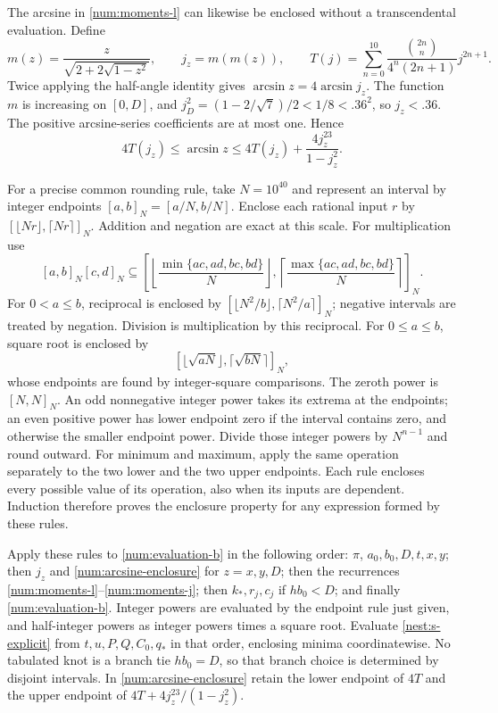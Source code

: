 The arcsine in \eqref{num:moments-l} can likewise be enclosed
without a transcendental evaluation. Define
\[
 m(z)=\frac{z}{\sqrt{2+2\sqrt{1-z^2}}},\qquad
 j_z=m(m(z)),\qquad
 T(j)=\sum_{n=0}^{10}\frac{\binom{2n}{n}}{4^n(2n+1)}j^{2n+1}.
\]
Twice applying the half-angle identity gives
$\arcsin z=4\arcsin j_z$. The function $m$ is increasing on
$[0,D]$, and
$j_D^2=(1-2/\sqrt7)/2<1/8<.36^2$, so $j_z<.36$.
The positive arcsine-series coefficients are at most one. Hence
\begin{equation}\label{num:arcsine-enclosure}
 4T(j_z)\le\arcsin z
 \le4T(j_z)+\frac{4j_z^{23}}{1-j_z^2}.
\end{equation}

For a precise common rounding rule, take $N=10^{40}$ and represent
an interval by integer endpoints $[a,b]_N=[a/N,b/N]$.
Enclose each rational input $r$ by
$[\lfloor Nr\rfloor,\lceil Nr\rceil]_N$. Addition and negation
are exact at this scale. For multiplication use
\[
 [a,b]_N[c,d]_N\subseteq
 \left[\left\lfloor\frac{\min\{ac,ad,bc,bd\}}N\right\rfloor,
       \left\lceil\frac{\max\{ac,ad,bc,bd\}}N\right\rceil\right]_N.
\]
For $0<a\le b$, reciprocal is enclosed by
$[\lfloor N^2/b\rfloor,\lceil N^2/a\rceil]_N$;
negative intervals are treated by negation. Division is multiplication
by this reciprocal. For $0\le a\le b$, square root is enclosed by
\[
 [\lfloor\sqrt{aN}\rfloor,\lceil\sqrt{bN}\rceil]_N,
\]
whose endpoints are found by integer-square comparisons.
The zeroth power is $[N,N]_N$.
An odd nonnegative integer power takes its extrema at the endpoints;
an even positive power has lower endpoint zero if the interval contains
zero, and otherwise the smaller endpoint power. Divide those integer
powers by $N^{n-1}$ and round outward. For minimum and maximum,
apply the same operation separately to the two lower and the two upper
endpoints. Each rule encloses every possible value of its operation,
also when its inputs are dependent. Induction therefore proves the
enclosure property for any expression formed by these rules.

Apply these rules to \eqref{num:evaluation-b} in the following order:
$\pi$, $a_0,b_0,D,t,x,y$; then $j_z$ and
\eqref{num:arcsine-enclosure} for $z=x,y,D$; then the recurrences
\eqref{num:moments-l}--\eqref{num:moments-j}; then $k_*,r_j,c_j$
if $hb_0<D$; and finally \eqref{num:evaluation-b}. Integer powers
are evaluated by the endpoint rule just given, and half-integer powers
as integer powers times a square root. Evaluate
\eqref{nest:s-explicit} from $t,u,P,Q,C_0,q_*$ in that order,
enclosing minima coordinatewise. No tabulated knot is a branch tie
$hb_0=D$, so that branch choice is determined by disjoint intervals.
In \eqref{num:arcsine-enclosure} retain the lower endpoint of
$4T$ and the upper endpoint of $4T+4j_z^{23}/(1-j_z^2)$.

